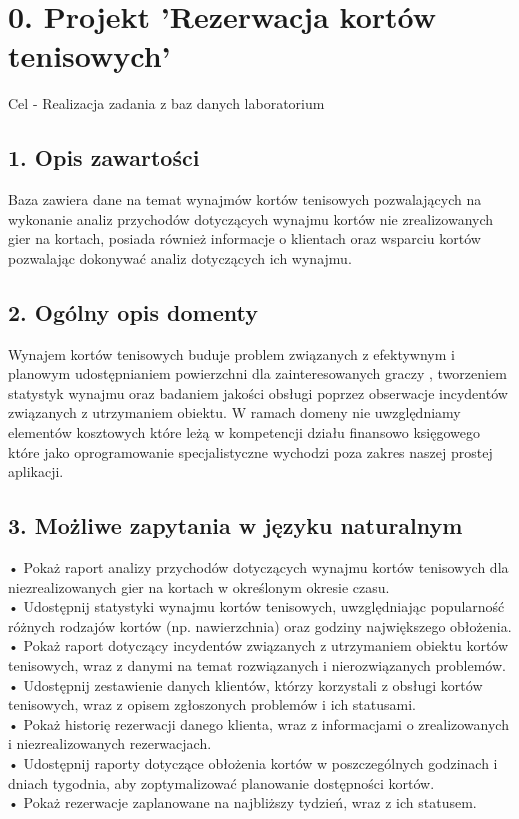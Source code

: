 \documentclass{article}
\begin{document}
\section*{0. Projekt 'Rezerwacja kortów tenisowych'}
Cel - Realizacja zadania z baz danych  laboratorium 

\subsection*{1. Opis zawartości}

Baza zawiera dane na temat wynajmów kortów tenisowych pozwalających na wykonanie analiz przychodów dotyczących wynajmu kortów nie zrealizowanych gier na kortach, posiada również informacje o klientach oraz wsparciu kortów pozwalając dokonywać analiz dotyczących ich wynajmu.


\subsection*{2. Ogólny opis domenty}

Wynajem kortów tenisowych buduje problem  związanych z efektywnym i planowym udostępnianiem powierzchni dla zainteresowanych graczy , tworzeniem statystyk wynajmu oraz badaniem jakości obsługi poprzez obserwacje incydentów związanych z utrzymaniem obiektu.
W ramach domeny nie uwzględniamy elementów kosztowych  które leżą w kompetencji działu finansowo księgowego które jako oprogramowanie specjalistyczne  wychodzi poza zakres naszej prostej aplikacji.


\subsection*{3. Możliwe zapytania w języku naturalnym}

\noindent

•	Pokaż raport analizy przychodów dotyczących wynajmu kortów tenisowych dla niezrealizowanych gier na kortach w określonym okresie czasu.\\
•	Udostępnij statystyki wynajmu kortów tenisowych, uwzględniając popularność różnych rodzajów kortów (np. nawierzchnia) oraz godziny największego obłożenia.\\
•	Pokaż raport dotyczący incydentów związanych z utrzymaniem obiektu kortów tenisowych, wraz z danymi na temat rozwiązanych i nierozwiązanych problemów.\\
•	Udostępnij zestawienie danych klientów, którzy korzystali z obsługi kortów tenisowych, wraz z opisem zgłoszonych problemów i ich statusami.\\
•	Pokaż historię rezerwacji danego klienta, wraz z informacjami o zrealizowanych i niezrealizowanych rezerwacjach.\\
•	Udostępnij raporty dotyczące obłożenia kortów w poszczególnych godzinach i dniach tygodnia, aby zoptymalizować planowanie dostępności kortów.\\
•	Pokaż rezerwacje zaplanowane na najbliższy tydzień, wraz z ich statusem.
\end{document}
